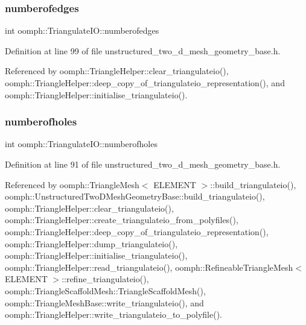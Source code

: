 \mbox{\label{structoomph_1_1TriangulateIO_ab444b409c5d6d1796e114e5846c7fc1b}} 
\subsubsection{\texorpdfstring{numberofedges}{numberofedges}}
{\footnotesize\ttfamily int oomph\+::\+Triangulate\+I\+O\+::numberofedges}



Definition at line 99 of file unstructured\+\_\+two\+\_\+d\+\_\+mesh\+\_\+geometry\+\_\+base.\+h.



Referenced by oomph\+::\+Triangle\+Helper\+::clear\+\_\+triangulateio(), oomph\+::\+Triangle\+Helper\+::deep\+\_\+copy\+\_\+of\+\_\+triangulateio\+\_\+representation(), and oomph\+::\+Triangle\+Helper\+::initialise\+\_\+triangulateio().

\mbox{\label{structoomph_1_1TriangulateIO_a3a79dd389487ce78445394dc8c042ad8}} 
\subsubsection{\texorpdfstring{numberofholes}{numberofholes}}
{\footnotesize\ttfamily int oomph\+::\+Triangulate\+I\+O\+::numberofholes}



Definition at line 91 of file unstructured\+\_\+two\+\_\+d\+\_\+mesh\+\_\+geometry\+\_\+base.\+h.



Referenced by oomph\+::\+Triangle\+Mesh$<$ E\+L\+E\+M\+E\+N\+T $>$\+::build\+\_\+triangulateio(), oomph\+::\+Unstructured\+Two\+D\+Mesh\+Geometry\+Base\+::build\+\_\+triangulateio(), oomph\+::\+Triangle\+Helper\+::clear\+\_\+triangulateio(), oomph\+::\+Triangle\+Helper\+::create\+\_\+triangulateio\+\_\+from\+\_\+polyfiles(), oomph\+::\+Triangle\+Helper\+::deep\+\_\+copy\+\_\+of\+\_\+triangulateio\+\_\+representation(), oomph\+::\+Triangle\+Helper\+::dump\+\_\+triangulateio(), oomph\+::\+Triangle\+Helper\+::initialise\+\_\+triangulateio(), oomph\+::\+Triangle\+Helper\+::read\+\_\+triangulateio(), oomph\+::\+Refineable\+Triangle\+Mesh$<$ E\+L\+E\+M\+E\+N\+T $>$\+::refine\+\_\+triangulateio(), oomph\+::\+Triangle\+Scaffold\+Mesh\+::\+Triangle\+Scaffold\+Mesh(), oomph\+::\+Triangle\+Mesh\+Base\+::write\+\_\+triangulateio(), and oomph\+::\+Triangle\+Helper\+::write\+\_\+triangulateio\+\_\+to\+\_\+polyfile().


